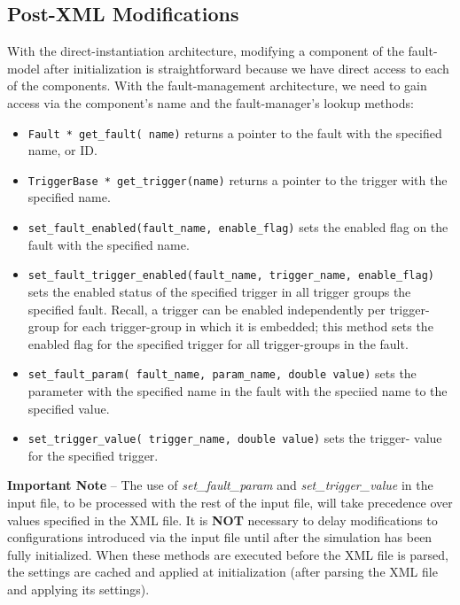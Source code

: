 \documentclass[11pt,fleqn]{report}
\begin{document}
\subsection{Post-XML Modifications}
With the direct-instantiation architecture, modifying a component of the
fault-model after initialization is straightforward because we have direct
access to
each of the components. With the fault-management architecture, we need to gain
access via the component's name and the fault-manager's lookup methods:
\begin{itemize}
 \item \verb'Fault * get_fault( name)'
   returns a pointer to the fault with the specified name, or ID.
 \item \verb'TriggerBase * get_trigger(name)'
   returns a pointer to the trigger with the specified name.
 \item \verb'set_fault_enabled(fault_name, enable_flag)'
   sets the enabled flag on the fault with the specified name.
 \item \verb'set_fault_trigger_enabled(fault_name, trigger_name, enable_flag)'
   sets the
   enabled status of the specified trigger in all trigger groups the specified
   fault. Recall, a trigger can be enabled independently per trigger-group for
   each trigger-group in which it is embedded; this method sets the enabled flag
   for the specified trigger for all trigger-groups in the fault.
 \item \verb'set_fault_param( fault_name, param_name, double value)'
   sets the parameter with the specified name in the fault with the speciied
   name to the specified
   value.
 \item \verb'set_trigger_value( trigger_name, double value)' sets the trigger-
   value for the specified trigger.
\end{itemize}

\textbf{Important Note} -- The use of \textit{set\_fault\_param} and
\textit{set\_trigger\_value} in the input file, to be processed with the
rest of the input file, will take precedence over values specified in the
XML file. It is \textbf{NOT} necessary to delay modifications to
configurations introduced via the input file until after
the simulation has been fully initialized. When these methods are executed
before the XML file is parsed, the settings are cached and applied at
initialization (after parsing the XML file and applying its settings).
\end{document}
